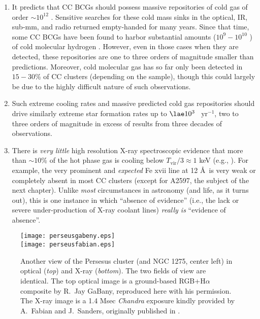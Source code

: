 \begin{enumerate}


\item It predicts that CC BCGs should possess massive repositories of cold gas of order $\sim10^{12}$ \Msol.
Sensitive searches for these cold mass sinks in the optical, IR, sub-mm, and radio returned empty-handed for many years. Since that time, 
some CC BCGs have been 
found to harbor substantial amounts ($10^9-10^{10}$ \Msol) of cold molecular hydrogen \citep{edge01,edge03,donahue00,salome06}. However, even in those cases when they are detected, 
these repositories 
are one to three orders of magnitude smaller than predictions. Moreover, cold molecular gas has so far only been 
detected in $15-30$\% of CC clusters (depending on the sample), though this could largely be due to the highly 
difficult nature of such observations.  



\item Such extreme cooling rates and massive predicted cold gas repositories should drive 
similarly extreme star formation rates up to $\lae10^3$ \Msol\ yr$^{-1}$,  two to three 
orders of magnitude in excess of results from three decades of observations.




\item There is {\it very little} high resolution X-ray spectroscopic evidence
that more than $\sim10$\% of the hot phase gas is cooling below $T_\mathrm{vir}
/ 3 \approx 1$ keV (e.g., \citealt{peterson03}). For example, the very
prominent and {\it expected} Fe {\sc xvii} line at 12 \AA\ is very weak or
completely absent in most CC clusters (except for A2597, the subject of the
next chapter).  Unlike {\it most} circumstances in astronomy (and life, as it
turns out), this is one instance in which ``absence of evidence'' (i.e., the lack or 
severe under-production of X-ray coolant lines) {\it really
is} ``evidence of absence''.  


\end{enumerate}







 
\begin{figure}
\begin{center}
\texttt{[image: perseusgabeny.eps]}\\
\texttt{[image: perseusfabian.eps]}
\end{center}
\caption[Another view of the Perseus cluster ({\it Chandra} X-ray, ground-based Optical)]{Another view of the Persesus cluster (and NGC 1275, center left) in optical ({\it top}) and X-ray ({\it bottom}).
The two fields of view are identical. The top optical image is a ground-based RGB+H$\alpha$ composite
by R.~Jay GaBany, reproduced here with his permission. The X-ray image is a 1.4 Msec {\it Chandra} exposure kindly provided by A.~Fabian and J.~Sanders, originally published in \citet{fabian11}.   }
\label{fig:intro_gabany}
\end{figure}




